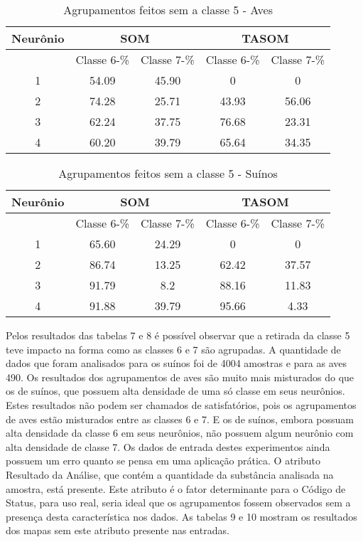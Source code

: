 \begin{table}[h]
\centering
\caption{Agrupamentos feitos sem a classe 5 - Aves}
\label{my-label}
\begin{tabular}{|c|c|c|c|c|}
\hline
Neurônio & \multicolumn{2}{c|}{SOM} & \multicolumn{2}{c|}{TASOM} \\ \hline
         & Classe 6-\%    & Classe 7-\%   & Classe 6-\%     & Classe 7-\%   \\ \hline
1        & 54.09       & 45.90      & 0            & 0           \\ \hline
2        & 74.28           & 25.71          & 43.93        & 56.06       \\ \hline
3        & 62.24           & 37.75          & 76.68        & 23.31       \\ \hline
4        & 60.20       & 39.79      & 65.64        & 34.35       \\ \hline
\end{tabular}
\end{table}

\begin{table}[h]
\centering
\caption{Agrupamentos feitos sem a classe 5 - Suínos}
\label{my-label}
\begin{tabular}{|c|c|c|c|c|}
\hline
Neurônio & \multicolumn{2}{c|}{SOM} & \multicolumn{2}{c|}{TASOM} \\ \hline
         & Classe 6-\%    & Classe 7-\%   & Classe 6-\%     & Classe 7-\%    \\ \hline
1        & 65.60       & 24.29      & 0            & 0           \\ \hline
2        & 86.74           & 13.25          & 62.42        & 37.57       \\ \hline
3        & 91.79           & 8.2          & 88.16        & 11.83       \\ \hline
4        & 91.88       & 39.79      & 95.66        & 4.33        \\ \hline
\end{tabular}
\end{table}

Pelos resultados das tabelas 7 e 8 é possível observar que a retirada da classe 5 teve impacto na forma como as classes 6 e 7 são agrupadas. A quantidade de dados que foram analisados para os suínos foi de 4004 amostras e para as aves 490. Os resultados dos agrupamentos de aves são muito mais misturados do que os de suínos, que possuem alta densidade de uma só classe em seus neurônios. Estes resultados não podem ser chamados de satisfatórios, pois os agrupamentos de aves estão misturados entre as classes 6 e 7. E os de suínos, embora possuam alta densidade da classe 6 em seus neurônios, não possuem algum neurônio com alta densidade de classe 7. Os dados de entrada destes experimentos ainda possuem um erro quanto se pensa em uma aplicação prática. O atributo Resultado da Análise, que contém a quantidade da substância analisada na amostra, está presente. Este atributo é o fator determinante para o Código de Status, para uso real, seria ideal que os agrupamentos fossem observados sem a presença desta característica nos dados. As tabelas 9 e 10 mostram os resultados dos mapas sem este atributo presente nas entradas. 

